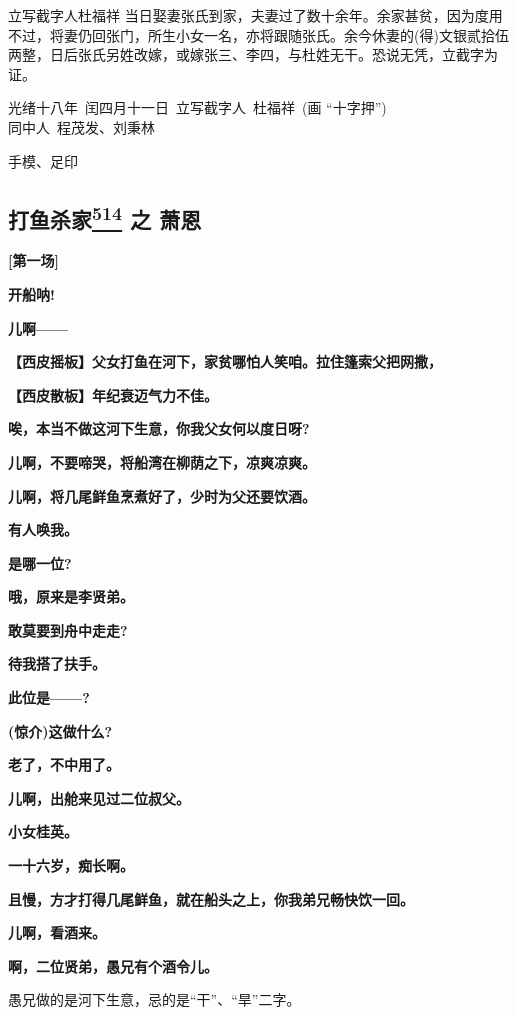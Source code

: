 立写截字人杜福祥
当日娶妻张氏到家，夫妻过了数十余年。余家甚贫，因为度用不过，将妻仍回张门，所生小女一名，亦将跟随张氏。余今休妻的(得)文银贰拾伍两整，日后张氏另姓改嫁，或嫁张三、李四，与杜姓无干。恐说无凭，立截字为证。

光绪十八年~闰四月十一日~立写截字人~杜福祥~(画 ``十字押'')\\

同中人~程茂发、刘秉林

手模、足印

\newpage
\hypertarget{ux6253ux9c7cux6740ux5bb6-ux4e4b-ux8427ux6069}{%
\subsection{\texorpdfstring{打鱼杀家\protect\hyperlink{fn514}{\textsuperscript{514}}
之
萧恩}{打鱼杀家514 之 萧恩}}\label{ux6253ux9c7cux6740ux5bb6-ux4e4b-ux8427ux6069}}

\textbf{{[}第一场{]}}

\textbf{开船呐!}

\textbf{儿啊------}

\textbf{【西皮摇板】父女打鱼在河下，家贫哪怕人笑咱。拉住篷索父把网撒，}

\textbf{【西皮散板】年纪衰迈气力不佳。}

\textbf{唉，本当不做这河下生意，你我父女何以度日呀?}

\textbf{儿啊，不要啼哭，将船湾在柳荫之下，凉爽凉爽。}

\textbf{儿啊，将几尾鲜鱼烹煮好了，少时为父还要饮酒。}

\textbf{有人唤我。}

\textbf{是哪一位?}

\textbf{哦，原来是李贤弟。}

\textbf{敢莫要到舟中走走?}

\textbf{待我搭了扶手。}

\textbf{此位是------?}

\textbf{(惊介)这做什么?}

\textbf{老了，不中用了。}

\textbf{儿啊，出舱来见过二位叔父。}

\textbf{小女桂英。}

\textbf{一十六岁，痴长啊。}

\textbf{且慢，方才打得几尾鲜鱼，就在船头之上，你我弟兄畅快饮一回。}

\textbf{儿啊，看酒来。}

\textbf{啊，二位贤弟，愚兄有个酒令儿。}

愚兄做的是河下生意，忌的是``干''、``旱''二字。

